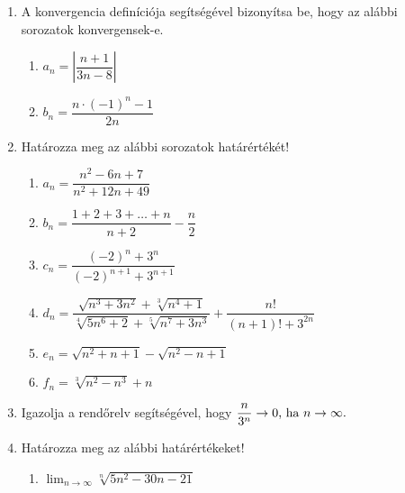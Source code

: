 \documentclass[a4paper, 12pt]{scrartcl}
\begin{document}
\begin{enumerate}
  \item A konvergencia definíciója segítségével bizonyítsa be, hogy az alábbi
        sorozatok kon\-ver\-gens\-ek-e.
        \begin{enumerate}
          \item $a_n = \left|
                  \dfrac{n + 1}{3n - 8}
                  \right|$

          \item $b_n = \dfrac{n \cdot (-1)^n - 1}{2n}$
        \end{enumerate}

  \item Határozza meg az alábbi sorozatok határértékét!
        \begin{enumerate}
          \item $a_n = \dfrac{n^2 - 6n + 7}{n^2 + 12n + 49}$

          \item $b_n = \dfrac{1 + 2 + 3 + \dots + n}{n + 2} - \dfrac{n}{2}$

          \item $c_n = \dfrac{(-2)^n + 3^n}{(-2)^{n + 1} + 3^{n + 1}}$

          \item $d_n = \dfrac{
                    \sqrt{n^3 + 3n^2} + \sqrt[3]{n^4 + 1}
                  }{
                    \sqrt[4]{5n^6 + 2} + \sqrt[5]{n^7 + 3n^3}
                  } + \dfrac{n!}{(n+1)! + 3^{2n}}$

          \item $e_n = \sqrt{n^2 + n + 1} - \sqrt{n^2 - n + 1}$

          \item $f_n = \sqrt[3]{n^2 - n^3} + n$
        \end{enumerate}

  \item Igazolja a rendőrelv segítségével, hogy
        $
          \dfrac{n}{3^n} \rightarrow 0
          \text{, ha }
          n \rightarrow \infty
          \text.
        $

  \item Határozza meg az alábbi határértékeket!
        \begin{multicols}{2}
          \begin{enumerate}
            \item $\displaystyle
                    \lim_{n \rightarrow \infty} \sqrt[n]{5n^2 - 30n - 21}
                  $


\end{enumerate}
\end{multicols}
\end{enumerate}
\end{document}
